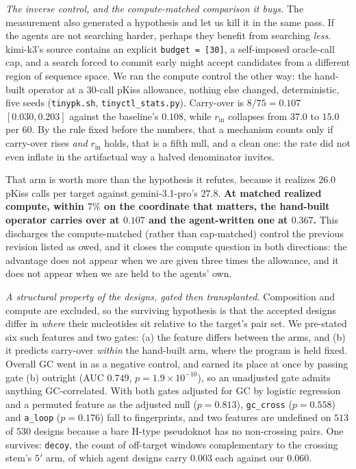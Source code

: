 \documentclass[11pt]{article}
\begin{document}
\emph{The inverse control, and the compute-matched comparison it buys.} The measurement also generated a
hypothesis and let us kill it in the same pass. If the agents are not searching harder, perhaps they benefit
from searching \emph{less}. kimi-k3's source contains an explicit \texttt{budget = [30]}, a self-imposed
oracle-call cap, and a search forced to commit early might accept candidates from a different region of
sequence space. We ran the compute control the other way: the hand-built operator at a $30$-call pKiss
allowance, nothing else changed, deterministic, five seeds (\texttt{tinypk.sh},
\texttt{tinyctl\_stats.py}). Carry-over is $8/75=\mathbf{0.107}$ $[0.030,0.203]$ against the baseline's
$0.108$, while $r_{\mathrm{in}}$ collapses from $37.0$ to $15.0$ per $60$. By the rule fixed before the
numbers, that a mechanism counts only if carry-over rises \emph{and} $r_{\mathrm{in}}$ holds, that is a fifth
null, and a clean one: the rate did not even inflate in the artifactual way a halved denominator invites.

That arm is worth more than the hypothesis it refutes, because it realizes $26.0$ pKiss calls per target
against gemini-3.1-pro's $27.8$. \textbf{At matched realized compute, within $7\%$ on the coordinate that
matters, the hand-built operator carries over at $0.107$ and the agent-written one at $0.367$.} This
discharges the compute-matched (rather than cap-matched) control the previous revision listed as owed, and it
closes the compute question in both directions: the advantage does not appear when we are given three times
the allowance, and it does not appear when we are held to the agents' own.

\emph{A structural property of the designs, gated then transplanted.} Composition and compute are excluded, so
the surviving hypothesis is that the accepted designs differ in \emph{where} their nucleotides sit relative to
the target's pair set. We pre-stated six such features and two gates: (a) the feature differs between the arms,
and (b) it predicts carry-over \emph{within} the hand-built arm, where the program is held fixed. Overall GC
went in as a negative control, and earned its place at once by passing gate (b) outright (AUC $0.749$,
$p{=}1.9\!\times\!10^{-10}$), so an unadjusted gate admits anything GC-correlated. With both gates adjusted for
GC by logistic regression and a permuted feature as the adjusted null ($p{=}0.813$), \texttt{gc\_cross}
($p{=}0.558$) and \texttt{a\_loop} ($p{=}0.176$) fall to fingerprints, and two features are undefined on $513$
of $530$ designs because a bare H-type pseudoknot has no non-crossing pairs. One survives: \texttt{decoy}, the
count of off-target windows complementary to the crossing stem's $5'$ arm, of which agent designs carry $0.003$
each against our $0.060$.
\end{document}
